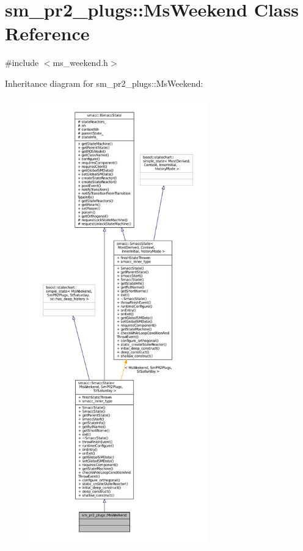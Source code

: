 \hypertarget{classsm__pr2__plugs_1_1MsWeekend}{}\section{sm\+\_\+pr2\+\_\+plugs\+:\+:Ms\+Weekend Class Reference}
\label{classsm__pr2__plugs_1_1MsWeekend}


{\ttfamily \#include $<$ms\+\_\+weekend.\+h$>$}



Inheritance diagram for sm\+\_\+pr2\+\_\+plugs\+:\+:Ms\+Weekend\+:
\nopagebreak
\begin{figure}[H]
\begin{center}
\leavevmode
\includegraphics[height=550pt]{classsm__pr2__plugs_1_1MsWeekend__inherit__graph}
\end{center}
\end{figure}


